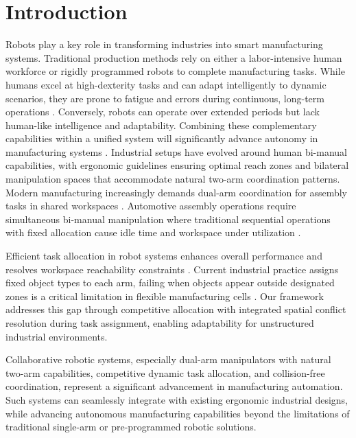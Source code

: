 \documentclass[pdflatex,sn-mathphys-num]{sn-jnl}%
\theoremstyle{thmstyleone}%
\theoremstyle{thmstylethree}%
\begin{document}
\section{Introduction}
\label{intro}
Robots play a key role in transforming industries into smart manufacturing systems. Traditional production methods rely on either a labor-intensive human workforce or rigidly programmed robots to complete manufacturing tasks. While humans excel at high-dexterity tasks and can adapt intelligently to dynamic scenarios, they are prone to fatigue and errors during continuous, long-term operations \cite{T-mech4}. Conversely, robots can operate over extended periods but lack human-like intelligence and adaptability. Combining these complementary capabilities within a unified system will significantly advance autonomy in manufacturing systems \cite{intro_1}. Industrial setups have evolved around human bi-manual capabilities, with ergonomic guidelines ensuring optimal reach zones and bilateral manipulation spaces that accommodate natural two-arm coordination patterns. Modern manufacturing increasingly demands dual-arm coordination for assembly tasks in shared workspaces \cite{qin2024online}. Automotive assembly operations require simultaneous bi-manual manipulation where traditional sequential operations with fixed allocation cause idle time and workspace under utilization \cite{marvel2018multi,vision_1}.

Efficient task allocation in robot systems enhances overall performance and resolves workspace reachability constraints \cite{intro_4, intro_11, patra2024}. Current industrial practice assigns fixed object types to each arm, failing when objects appear outside designated zones is a critical limitation in flexible manufacturing cells \cite{pedersen2016robot}. Our framework addresses this gap through competitive allocation with integrated spatial conflict resolution during task assignment, enabling adaptability for unstructured industrial environments. 

Collaborative robotic systems, especially dual-arm manipulators with natural two-arm capabilities, competitive dynamic task allocation, and collision-free coordination, represent a significant advancement in manufacturing automation. Such systems can seamlessly integrate with existing ergonomic industrial designs, while advancing autonomous manufacturing capabilities beyond the limitations of traditional single-arm or pre-programmed robotic solutions.
\end{document}
